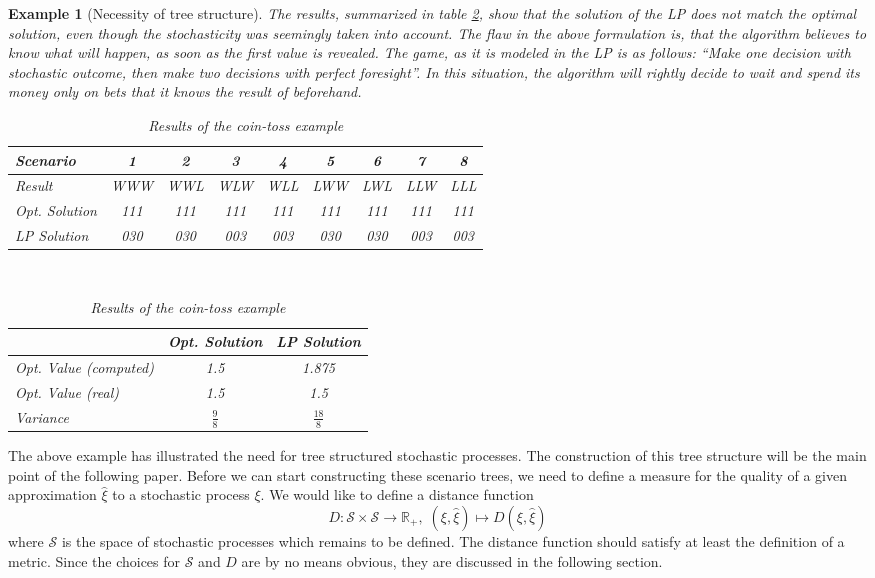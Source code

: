 \documentclass[a4paper, 12pt] {article}
\newtheorem*{example}{Example}
\begin{document}
\begin{example}[Necessity of tree structure]
The results, summarized in table \ref{tab:coin-toss-results}, show that the solution of the LP does not match the optimal solution, even though the stochasticity was seemingly taken into account. The flaw in the above formulation is, that the algorithm believes to know what will happen, as soon as the first value is revealed. The game, as it is modeled in the LP is as follows: ``Make one decision with stochastic outcome, then make two decisions with perfect foresight''. In this situation, the algorithm will rightly decide to wait and spend its money only on bets that it knows the result of beforehand.
\begin{table}
  \small\centering
  \begin{tabular}{lcccccccc}
    \hline 
    Scenario&1&2&3&4&5&6&7&8\\\hline\hline
    Result&WWW&WWL&WLW&WLL&LWW&LWL&LLW&LLL\\
    Opt. Solution&111&111&111&111&111&111&111&111\\
    LP Solution&030&030&003&003&030&030&003&003\\\hline
  \end{tabular}
  \vspace*{0.5cm}\\
  \begin{tabular}{lcc}
    \hline
    &Opt. Solution&LP Solution\\\hline\hline
    Opt. Value (computed)&1.5&1.875\\
    Opt. Value (real)&1.5&1.5\\
    Variance&$\frac{9}{8}$&$\frac{18}{8}$\\
    \hline
  \end{tabular}
  \caption{Results of the coin-toss example}
  \label{tab:coin-toss-results}
\end{table}
\end{example}

The above example has illustrated the need for tree structured stochastic processes. The construction of this tree structure will be the main point of the following paper. Before we can start constructing these scenario trees, we need to define a measure for the quality of a given approximation $\hat{\xi}$ to a stochastic process $\xi$. We would like to define a distance function 
\begin{equation}
  \label{eq:distance-function-intro}
  D:\mathcal{S} \times \mathcal{S} \rightarrow \mathbb{R}_+,\;(\xi, \hat{\xi})\mapsto D(\xi, \hat{\xi})
\end{equation}
where $\mathcal{S}$ is the space of stochastic processes which remains to be defined. The distance function should satisfy at least the definition of a metric. Since the choices for $\mathcal{S}$ and $D$ are by no means obvious, they are discussed in the following section.
\end{document}
